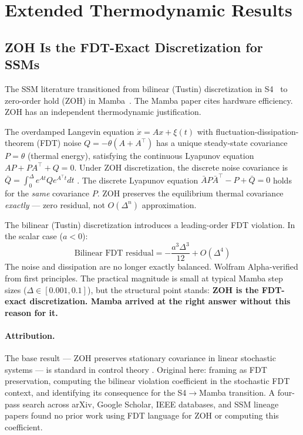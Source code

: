 \documentclass[11pt,a4paper]{article}
\begin{document}
\section{Extended Thermodynamic Results}
\label{sec:physics}

\subsection{ZOH Is the FDT-Exact Discretization for SSMs}

The SSM literature transitioned from bilinear (Tustin) discretization in
S4~\citep{gu2021efficiently} to zero-order hold (ZOH) in
Mamba~\citep{gu2023mamba}. The Mamba paper cites hardware efficiency. ZOH has an
independent thermodynamic justification.

The overdamped Langevin equation $\dot{x} = Ax + \xi(t)$ with
fluctuation-dissipation-theorem (FDT) noise $Q = -\theta(A + A^\top)$ has a
unique steady-state covariance $P = \theta$ (thermal energy), satisfying the
continuous Lyapunov equation $AP + PA^\top + Q = 0$. Under ZOH discretization,
the discrete noise covariance is $\bar{Q} = \int_0^\Delta e^{At} Q e^{A^\top t} dt$
\citep{vanloan1978computing}. The discrete Lyapunov equation
$\bar{A}P\bar{A}^\top - P + \bar{Q} = 0$ holds for the \emph{same} covariance
$P$. ZOH preserves the equilibrium thermal covariance \emph{exactly} --- zero
residual, not $O(\Delta^n)$ approximation.

The bilinear (Tustin) discretization introduces a leading-order FDT violation.
In the scalar case ($a < 0$):
\begin{equation}
  \text{Bilinear FDT residual} = -\frac{a^3 \Delta^3}{12} + O(\Delta^4)
\end{equation}
The noise and dissipation are no longer exactly balanced. Wolfram Alpha-verified
from first principles. The practical magnitude is small at typical Mamba step
sizes ($\Delta \in [0.001, 0.1]$), but the structural point stands: \textbf{ZOH
is the FDT-exact discretization. Mamba arrived at the right answer without this
reason for it.}

\paragraph{Attribution.} The base result --- ZOH preserves stationary covariance
in linear stochastic systems --- is standard in control theory
\citep{vanloan1978computing}. Original here: framing as FDT preservation,
computing the bilinear violation coefficient in the stochastic FDT context, and
identifying its consequence for the S4$\to$Mamba transition. A four-pass search
across arXiv, Google Scholar, IEEE databases, and SSM lineage papers found no
prior work using FDT language for ZOH or computing this coefficient.
\end{document}
